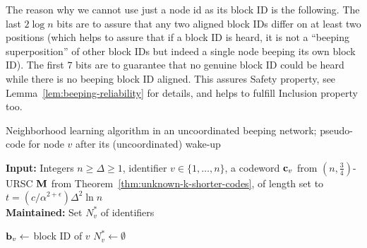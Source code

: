 \documentclass[11pt]{article}
\begin{document}
The reason why we cannot use just a node id as its block ID is the following.
The last $2\log n$ bits are to assure that any two aligned block IDs differ on at least two positions (which helps to assure that if a block ID is heard, it is not a ``beeping superposition'' of other block IDs but indeed a single node beeping its own block ID). The first $7$ bits are to guarantee that no genuine block ID could be heard while there is no beeping block ID aligned. 
This assures Safety property, see Lemma~\ref{lem:beeping-reliability} for details, and helps to fulfill Inclusion property too.



\begin{algorithm}[ht!]
\small
\caption{\small Neighborhood learning algorithm in an uncoordinated beeping network; pseudo-code for node $v$
after its (uncoordinated) wake-up}\label{alg:beeping}
\linespread{1.1}\selectfont 
\textbf{Input:} Integers $n \ge \Delta \ge 1$, identifier $v\in \{1,\ldots,n\}$, a codeword ${\mathbf c}_v$ 
from $(n, \frac{3}{4})$-URSC ${\mathbf M}$ from Theorem~\ref{thm:unknown-k-shorter-codes}, 
of length set to $t=(c/\alpha^{2+\epsilon}) \Delta^2 \ln n$ \\
\textbf{Maintained:} 
Set $N^*_v$ of identifiers



\BlankLine
   {${\mathbf b}_v \gets$ block ID of $v$} 
\;
   {$N^*_v \gets \emptyset$} \;


\BlankLine

\end{algorithm}
\end{document}
